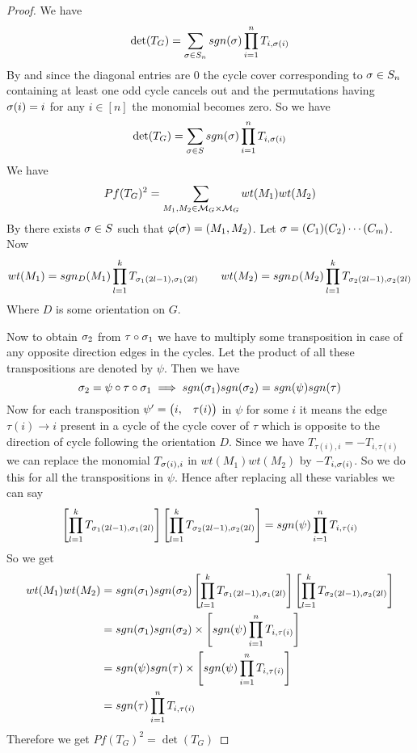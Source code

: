 \begin{proof}
	We have $$\det(T_G)=\sum_{\sigma\in S_n}sgn(\sigma)\prod_{i=1}^nT_{i,\sigma(i)}$$By  and since the diagonal entries are 0 the cycle cover corresponding to $\sigma\in S_n$ containing at least one odd cycle cancels out and the permutations having $\sigma(i)=i$ for any $i\in[n]$ the monomial becomes zero. So we have $$\det(T_G)=\sum_{\sigma\in S}sgn(\sigma)\prod_{i=1}^nT_{i,\sigma(i)}$$ We have $$Pf(T_G)^2=\sum_{M_1,M_2\in \mathcal{M}_G\times \mathcal{M}_G}wt(M_1)wt(M_2)$$By  there exists $\sigma\in S$ such that $\varphi(\sigma)=(M_1,M_2)$. Let $\sigma=(C_1)(C_2)\cdots (C_m)$. Now $$wt(M_1)=sgn_D(M_1)\prod_{l=1}^kT_{\sigma_1({2l-1}),\sigma_1({2l})}\qquad wt(M_2)=sgn_D(M_2)\prod_{l=1}^kT_{\sigma_2({2l-1}),\sigma_2({2l})}$$Where $D$ is some orientation on $G$.
	
	Now to obtain $\sigma_2$ from $\tau\circ\sigma_1$ we have to multiply some transposition in case of any opposite direction edges in the cycles. Let the product of all these transpositions are denoted by $\psi$. Then we have $$\sigma_2=\psi\circ\tau\circ \sigma_1\implies sgn(\sigma_1)sgn(\sigma_2)=sgn(\psi)sgn(\tau)$$Now for each transposition $\psi'=\left(\begin{matrix}i,& \tau(i)\end{matrix}\right)$  in $\psi$ for some $i$ it means the edge $\tau(i)\to i$ present in a cycle of the cycle cover of $\tau$ which  is opposite  to the direction of cycle following the orientation $D$. Since we have $T_{\tau(i),i}=-T_{i,\tau(i)}$ we can replace the monomial $T_{\sigma(i), i}$ in $wt(M_1)wt(M_2)$ by $-T_{i,\sigma(i)}$. So we do this for all the transpositions in $\psi$. Hence after replacing all these variables we can say $$\left[ \prod_{l=1}^kT_{\sigma_1({2l-1}),\sigma_1({2l})}\right] \left[  \prod_{l=1}^kT_{\sigma_2({2l-1}),\sigma_2({2l})}\right] =sgn(\psi)\prod_{i=1}^nT_{i,\tau(i)}$$So we get \begin{align*}
		wt(M_1)wt(M_2) & =sgn(\sigma_1)sgn(\sigma_2)\left[ \prod_{l=1}^kT_{\sigma_1({2l-1}),\sigma_1({2l})}\right] \left[  \prod_{l=1}^kT_{\sigma_2({2l-1}),\sigma_2({2l})}\right]\\
		& = sgn(\sigma_1)sgn(\sigma_2)\times \left[sgn(\psi)\prod_{i=1}^nT_{i,\tau(i)}\right]\\
		& = sgn(\psi)sgn(\tau)\times \left[sgn(\psi)\prod_{i=1}^nT_{i,\tau(i)}\right]\\
		& =sgn(\tau)\prod_{i=1}^nT_{i,\tau(i)}
	\end{align*}
Therefore we get $Pf(T_G)^2=\det(T_G)$
\end{proof}

